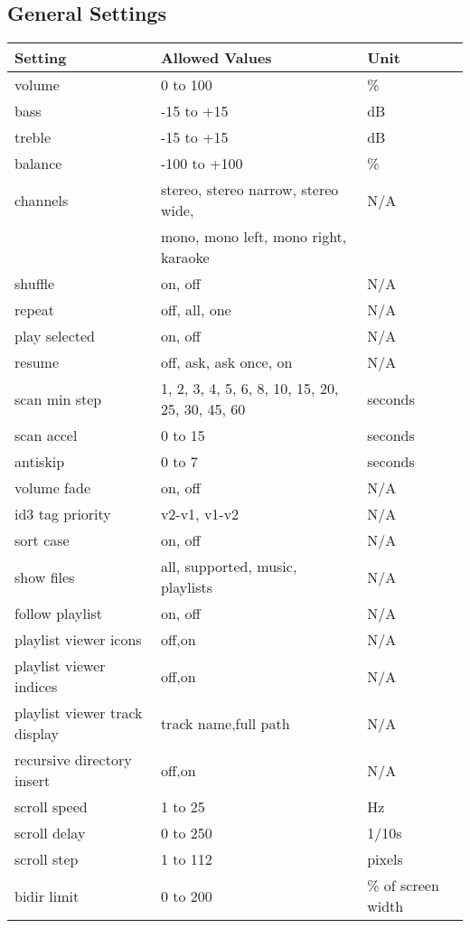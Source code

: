 \subsection{General Settings}
\begin{center}
  \begin{longtable}{@{}lll@{}}\toprule
    \textbf{Setting} & \textbf{Allowed Values} & \textbf{Unit}\\\midrule
     volume & 0 to 100 & \%\\
     bass & -15 to +15 & dB\\
     treble & -15 to +15 &dB\\
     balance & -100 to +100 & \%\\
     channels & stereo, stereo narrow, stereo wide, & N/A\\
              & mono, mono left, mono right, karaoke & \\
     shuffle & on, off & N/A\\
     repeat & off, all, one & N/A\\
     play selected & on, off & N/A\\
     resume & off, ask, ask once, on & N/A\\
     scan min step & 1, 2, 3, 4, 5, 6, 8, 10, 15, 20, 25, 30, 45, 60 & seconds\\
     scan accel & 0 to 15 & seconds\\
     antiskip & 0 to 7 & seconds\\
     volume fade & on, off & N/A\\
     id3 tag priority & v2-v1, v1-v2 & N/A\\
     sort case & on, off & N/A\\
     show files & all, supported, music, playlists & N/A\\
     follow playlist & on, off & N/A\\
     playlist viewer icons & off,on & N/A\\
     playlist viewer indices & off,on & N/A\\
     playlist viewer track display & track name,full path & N/A\\
     recursive directory insert & off,on & N/A\\
     scroll speed & 1 to 25 & Hz\\
     scroll delay & 0 to 250 & 1/10s\\
     scroll step & 1 to 112 & pixels\\
     bidir limit & 0 to 200 & \% of screen width\\

\end{longtable}
\end{center}

